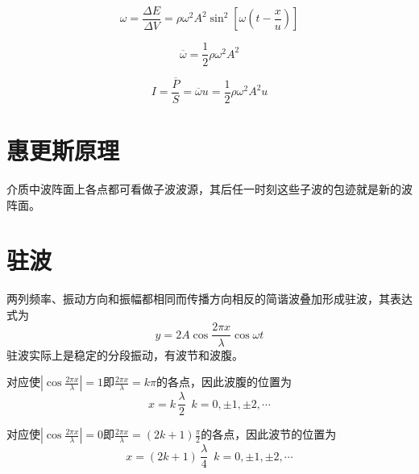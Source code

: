 \par {}
\begin{equation}
\omega = \frac{\Delta E}{\Delta V}= \rho \omega^2A^2\sin^2\left[ \omega (t-\frac{x}{u})\right] 
\end{equation}

\par {}
\begin{equation}
\overline{\omega }=\frac{1}{2}\rho \omega^2A^2
\end{equation}

\par {}
\begin{equation}
I=\frac{\overline{P}}{S}=\overline{\omega } u=\frac{1}{2}\rho \omega^2A^2u
\end{equation}

\section{惠更斯原理}
介质中波阵面上各点都可看做子波波源，其后任一时刻这些子波的包迹就是新的波阵面。

\section{驻波}
\jg
\par 两列频率、振动方向和振幅都相同而传播方向相反的简谐波叠加形成驻波，其表达式为
\begin{equation}
y=2A\cos \frac{2\pi x }{\lambda}\cos \omega t 
\end{equation}
驻波实际上是稳定的分段振动，有波节和波腹。\jg

\par {} 对应使$\displaystyle  \left| \cos \frac{2\pi x }{\lambda} \right| = 1$即$\displaystyle \frac{2\pi x }{\lambda} = k\pi $的各点，因此波腹的位置为
\begin{equation}
x=k\,\frac{\lambda }{2}\,\,\, k = 0, \pm 1,\pm 2, \cdots
\end{equation}

\par {} 对应使$\displaystyle  \left| \cos \frac{2\pi x }{\lambda} \right| = 0$即$\displaystyle \frac{2\pi x }{\lambda} = (2k+1)\frac{\pi }{2}$的各点，因此波节的位置为
\begin{equation}
x=(2k+1)\,\frac{\lambda }{4}\,\,\, k = 0, \pm 1,\pm 2, \cdots
\end{equation}

